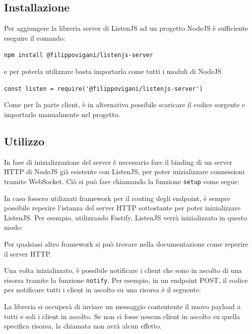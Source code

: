 \documentclass[12pt,a4paper,openright,twoside]{report}
\begin{document}
\subsection{Installazione}
Per aggiungere la libreria server di ListenJS ad un progetto NodeJS è sufficiente eseguire il comando:
\begin{center}
\lstinline{npm install @filippovigani/listenjs-server}
\end{center}
e per poterla utilizzare basta importarla come tutti i moduli di NodeJS
\begin{center}
\lstinline{const listen = require('@filippovigani/listenjs-server')}
\end{center}
Come per la parte client, è in alternativa possibile scaricare il codice sorgente\cite{listenjs_server_repo} e importarlo manualmente nel progetto.

\subsection{Utilizzo}
In fase di inizializzazione del server è necessario fare il binding di un server HTTP di NodeJS già esistente con ListenJS, per poter inizializzare connessioni tramite WebSocket. Ciò si può fare chiamando la funzione \lstinline{setup} come segue: 

In caso fossero utilizzati framework per il routing degli endpoint, è sempre possibile reperire l'istanza del server HTTP sottostante per poter inizializzare ListenJS. Per esempio, utilizzando Fastify, ListenJS verrà inizializzato in questo modo:

Per qualsiasi altro framework si può trovare nella documentazione come reperire il server HTTP.

\bigskip

Una volta inizializzato, è possibile notificare i client che sono in ascolto di una risorsa tramite la funzione \lstinline{notify}. Per esempio, in un endpoint POST, il codice per notificare tutti i client in ascolto su una risorsa è il seguente:


La libreria si occuperà di inviare un messaggio contentente il nuovo payload a tutti e soli i client in ascolto. Se non ci fosse nessun client in ascolto su quella specifica risorsa, la chiamata non avrà alcun effetto.

\end{document}

